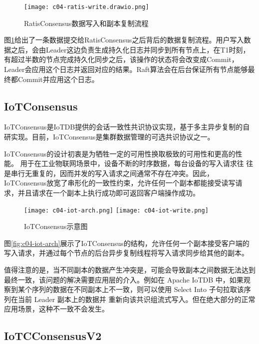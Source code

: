 \begin{figure}
  \centering
  \texttt{[image: c04-ratis-write.drawio.png]}
  \caption{RatisConsensus数据写入和副本复制流程}
  \label{fig:c04-ratis-write}
\end{figure}

图\ref{fig:c04-ratis-write}给出了一条数据提交给RatisConsensus之后背后的数据复制流程。用户写入数据之后，会由Leader这边负责生成持久化日志并同步到所有节点上，在T1时刻，有超过半数的节点完成持久化同步之后，该操作的状态将会改变成Commit，Leader会应用这个日志并返回对应的结果。Raft算法会在后台保证所有节点能够最终都Commit并应用这个日志。



\subsection{IoTConsensus}

IoTConsensus是IoTDB提供的会话一致性共识协议实现，基于多主异步复制的自研实现。目前，IoTConsensus是集群数据管理的可选共识协议之一。

IoTConsensus的设计初衷是为牺牲一定的可用性换取极致的可用性和更高的性能。
用于在工业物联网场景中，设备不断的时序数据，每台设备的写入请求往
往是串行无重复的，因而并发的写入请求之间通常不存在冲突。因此，IoTConsensus放宽了串形化的一致性约束，允许任何一个副本都能接受读写请求，并且请求在一个副本上执行成功即可返回客户端操作成功。


\begin{figure}
  \centering
    {\texttt{[image: c04-iot-arch.png]}}
    {\texttt{[image: c04-iot-write.png]}}
  \caption{IoTConsensus示意图}
  \label{fig:c04-iot-consensus}
\end{figure}

图\ref{fig:c04-iot-arch}展示了IoTConsensus的结构，允许任何一个副本接受客户端的写入请求，并通过每个节点的后台异步复制线程将写入请求同步给其他的副本。


值得注意的是，当不同副本的数据产生冲突是，可能会导致副本之间数据无法达到最终一致，该问题的解决需要应用层的介入。例如在 Apache IoTDB 中，如果观察到某个序列的数据在不同副本上不一致，则可以使用 Select Into 子句拉取该序列在当前 Leader 副本上的数据并
重新向该共识组流式写入。但在绝大部分的正常应用场景，这种不一致不会发生。


\subsection{IoTCConsensusV2}


